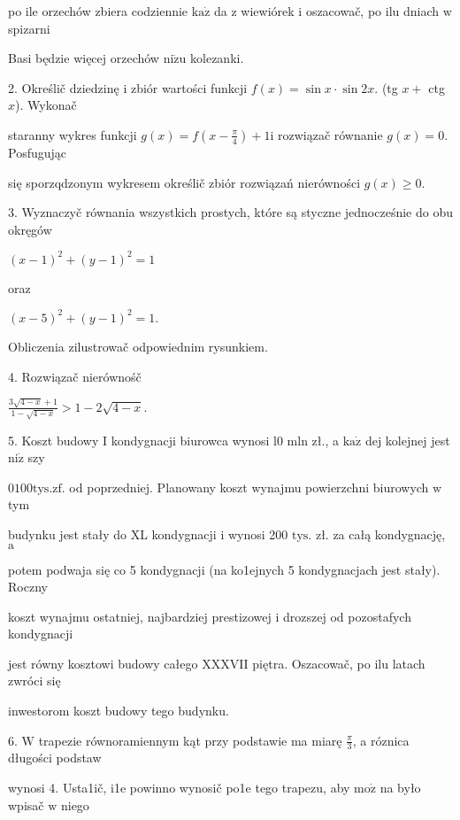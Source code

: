 \documentclass[a4paper,12pt]{article}
\begin{document}
po ile orzechów zbiera codziennie $\mathrm{k}\mathrm{a}\dot{\mathrm{z}}$ da $\mathrm{z}$ wiewiórek $\mathrm{i}$ oszacowač, po ilu dniach $\mathrm{w}$ spizarni

Basi będzie więcej orzechów $\mathrm{n}\mathrm{i}\dot{\mathrm{z}}\mathrm{u}$ kolezanki.

2. Określič dziedzinę $\mathrm{i}$ zbiór wartości funkcji $f(x)=\sin x\cdot\sin 2x$. (tg $x+$ ctg $x$). Wykonač

staranny wykres funkcji $g(x)=f(x-\displaystyle \frac{\pi}{4})+1\mathrm{i}$ rozwiązač równanie $g(x)=0$. Posfugując

się sporzqdzonym wykresem określič zbiór rozwiązań nierówności $g(x)\geq 0.$

3. Wyznaczyč równania wszystkich prostych, które są styczne jednocześnie do obu okręgów

$(x-1)^{2}+(y-1)^{2}=1$

oraz

$(x-5)^{2}+(y-1)^{2}=1.$

Obliczenia zilustrowač odpowiednim rysunkiem.

4. Rozwiązač nierównośč

$\displaystyle \frac{3\sqrt{4-x}+1}{1-\sqrt{4-x}}>1-2\sqrt{4-x}.$

5. Koszt budowy I kondygnacji biurowca wynosi l0 mln zł., a $\mathrm{k}\mathrm{a}\dot{\mathrm{z}}$ dej kolejnej jest $\mathrm{n}\mathrm{i}\dot{\mathrm{z}}$ szy

$0100\mathrm{t}\mathrm{y}\mathrm{s}. \mathrm{z}\mathrm{f}$. od poprzedniej. Planowany koszt wynajmu powierzchni biurowych $\mathrm{w}$ tym

budynku jest stały do XL kondygnacji $\mathrm{i}$ wynosi 200 $\mathrm{t}\mathrm{y}\mathrm{s}$. zł. za całą kondygnację, $\mathrm{a}$

potem podwaja się co 5 kondygnacji (na ko1ejnych 5 kondygnacjach jest stały). Roczny

koszt wynajmu ostatniej, najbardziej prestizowej $\mathrm{i}$ drozszej od pozostafych kondygnacji

jest równy kosztowi budowy całego XXXVII piętra. Oszacowač, po ilu latach zwróci się

inwestorom koszt budowy tego budynku.

6. $\mathrm{W}$ trapezie równoramiennym kąt przy podstawie ma miarę $\displaystyle \frac{\pi}{3}$, a róznica długości podstaw

wynosi 4. Usta1ič, i1e powinno wynosič po1e tego trapezu, aby $\mathrm{m}\mathrm{o}\dot{\mathrm{z}}$ na było wpisač $\mathrm{w}$ niego
\end{document}
